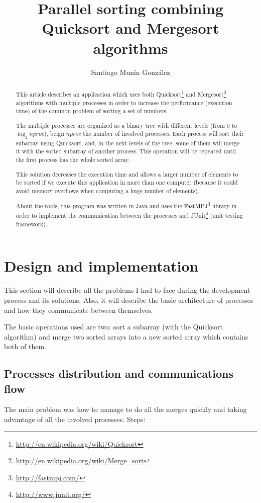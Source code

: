 \documentclass[a4paper,10pt]{article}
\title{Parallel sorting combining Quicksort and Mergesort algorithms}
\author{Santiago Munín González}
\begin{document}
\maketitle
\clearpage
\begin{abstract}
  This article describes an application which uses both Quicksort\footnote{\url{http://en.wikipedia.org/wiki/Quicksort}} and Mergesort\footnote{\url{http://en.wikipedia.org/wiki/Merge_sort}} algorithms 
  with multiple processes in order to increase the performance (execution time) of the common problem of sorting a set of numbers.
  
  The multiple processes are organized as a binary tree with different levels (from 0 to $\log_2 nproc$), 
  beign $nproc$ the number of involved processes. Each process will sort their subarray using Quicksort, and, in the next levels of the tree,
  some of them will merge it with the sorted subarray of another process. This operation will be repeated until the first process has the whole sorted array. 
  
  This solution decreases the execution time and allows a larger number of elements to be sorted if we execute this application 
  in more than one computer (because it could avoid memory overflows when computing a huge number of elements).
  
  About the tools, this program was written in Java and uses the FastMPJ\footnote{\url{http://fastmpj.com/}} library in order to implement the communication between the processes and 
  JUnit\footnote{\url{http://www.junit.org/}} (unit testing framework).
  
\end{abstract}
\clearpage

\section{Design and implementation}
  This section will describe all the problems I had to face during the development process and its solutions. Also, it will describe the basic architecture of
  processes and how they communicate between themselves.
  
  The basic operations used are two: sort a subarray (with the Quicksort algorithm) and merge two sorted arrays into a new sorted array 
  which contains both of them.
  
  \subsection{Processes distribution and communications flow}
    The main problem was how to manage to do all the merges quickly and taking advantage of all the involved processes.
    Steps:
    
\end{document}
